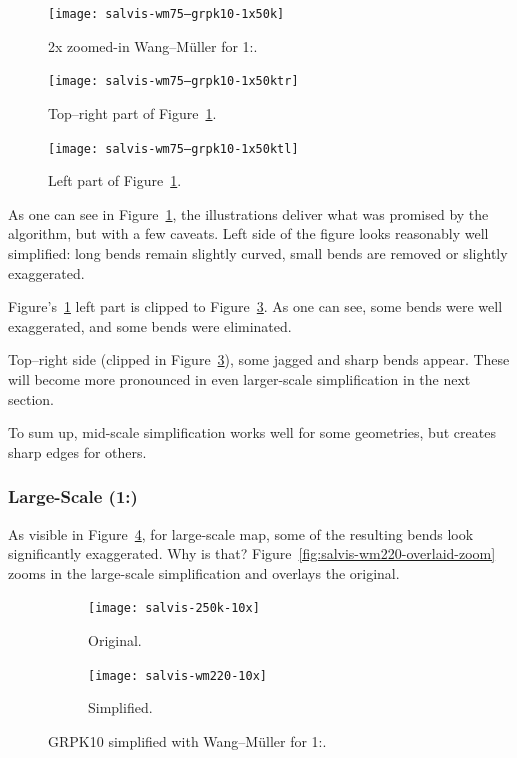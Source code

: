 \documentclass[a4paper]{article}
\newcommand{\WM}{Wang--M{\"u}ller}
\begin{document}
\begin{figure}[h!]
    \centering
    \texttt{[image: salvis-wm75--grpk10-1x50k]}
    \caption{2x zoomed-in {\WM} for 1:.}
    \label{fig:salvis-wm75--grpk10-1x50k}
\end{figure}

\begin{figure}[h!]
    \centering
    \texttt{[image: salvis-wm75--grpk10-1x50ktr]}
    \caption{Top--right part of Figure~\ref{fig:salvis-wm75--grpk10-1x50k}.}
    \label{fig:salvis-wm75--grpk10-1x50ktr}
\end{figure}

\begin{figure}[h!]
    \centering
    \texttt{[image: salvis-wm75--grpk10-1x50ktl]}
    \caption{Left part of Figure~\ref{fig:salvis-wm75--grpk10-1x50k}.}
    \label{fig:salvis-wm75--grpk10-1x50ktl}
\end{figure}

As one can see in Figure~\ref{fig:salvis-wm75--grpk10-1x50k}, the illustrations deliver
what was promised by the algorithm, but with a few caveats. Left side of the
figure looks reasonably well simplified: long bends remain slightly curved,
small bends are removed or slightly exaggerated.

Figure's~\ref{fig:salvis-wm75--grpk10-1x50k} left part is clipped to
Figure~\ref{fig:salvis-wm75--grpk10-1x50ktl}. As one can see, some bends were well
exaggerated, and some bends were eliminated.

Top--right side (clipped in Figure~\ref{fig:salvis-wm75--grpk10-1x50ktl}), some jagged
and sharp bends appear. These will become more pronounced in even larger-scale
simplification in the next section.

To sum up, mid-scale simplification works well for some geometries, but creates
sharp edges for others.

\clearpage

\subsubsection{Large-Scale (1:)}
\label{sec:analyzed-large-scale}

As visible in Figure~\ref{fig:salvis-wm220-10x}, for large-scale map, some of the
resulting bends look significantly exaggerated. Why is that?
Figure~\ref{fig:salvis-wm220-overlaid-zoom} zooms in the large-scale
simplification and overlays the original.

\begin{figure}[ht]
    \centering
    \begin{subfigure}[b]{.49\textwidth}
        \centering
        \texttt{[image: salvis-250k-10x]}
        \caption{Original.}
    \end{subfigure}
    \hfill
    \begin{subfigure}[b]{.49\textwidth}
        \centering
        \texttt{[image: salvis-wm220-10x]}
        \caption{Simplified.}
    \end{subfigure}
    \caption{GRPK10 simplified with {\WM} for 1:.}
    \label{fig:salvis-wm220-10x}
\end{figure}
\end{document}
